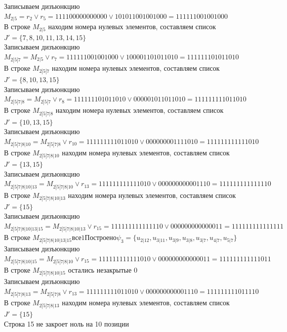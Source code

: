\documentclass[12pt,a4paper]{report}
\begin{document}
Записываем дизъюнкцию $M_{2 | 5} = r_{2}\vee r_{5} = 111100000000000 \vee 101011001001000 = 111111001001000$ \\
В строке $M_{2 | 5}$ находим номера нулевых элементов, составляем список $J' = \{7, 8, 10, 11, 13, 14, 15\}$ \\
Записываем дизъюнкцию $M_{2 | 5 | 7} = M_{2 | 5}\vee r_{7} = 111111001001000 \vee 100001101011010 = 111111101011010$ \\
В строке $M_{2 | 5 | 7}$ находим номера нулевых элементов, составляем список $J' = \{8, 10, 13, 15\}$ \\
Записываем дизъюнкцию $M_{2 | 5 | 7 | 8} = M_{2 | 5 | 7}\vee r_{8} = 111111101011010 \vee 000001011011010 = 111111111011010$ \\
В строке $M_{2 | 5 | 7 | 8}$ находим номера нулевых элементов, составляем список $J' = \{10, 13, 15\}$ \\
Записываем дизъюнкцию $M_{2 | 5 | 7 | 8 | 10} = M_{2 | 5 | 7 | 8}\vee r_{10} = 111111111011010 \vee 000000001111010 = 111111111111010$ \\
В строке $M_{2 | 5 | 7 | 8 | 10}$ находим номера нулевых элементов, составляем список $J' = \{13, 15\}$ \\
Записываем дизъюнкцию $M_{2 | 5 | 7 | 8 | 10 | 13} = M_{2 | 5 | 7 | 8 | 10}\vee r_{13} = 111111111111010 \vee 000000000001110 = 111111111111110$ \\
В строке $M_{2 | 5 | 7 | 8 | 10 | 13}$ находим номера нулевых элементов, составляем список $J' = \{15\}$ \\
Записываем дизъюнкцию $M_{2 | 5 | 7 | 8 | 10 | 13 | 15} = M_{2 | 5 | 7 | 8 | 10 | 13}\vee r_{15} = 111111111111110 \vee 000000000000011 = 111111111111111$ \\
В строке $M_{2 | 5 | 7 | 8 | 10 | 13 | 15} все 1 Построено \psi_{3} = \{u_{2 | 12},u_{3 | 11},u_{3 | 9},u_{3 | 8},u_{3 | 7},u_{4 | 7},u_{5 | 7}\}$ \\
Записываем дизъюнкцию $M_{2 | 5 | 7 | 8 | 10 | 15} = M_{2 | 5 | 7 | 8 | 10}\vee r_{15} = 111111111111010 \vee 000000000000011 = 111111111111011$ \\
В строке $M_{2 | 5 | 7 | 8 | 10 | 15}$ остались незакрытые $0$ \\
Записываем дизъюнкцию $M_{2 | 5 | 7 | 8 | 13} = M_{2 | 5 | 7 | 8}\vee r_{13} = 111111111011010 \vee 000000000001110 = 111111111011110$ \\
В строке $M_{2 | 5 | 7 | 8 | 13}$ находим номера нулевых элементов, составляем список $J' = \{15\}$ \\
Строка 15 не закроет ноль на 10 позиции \\
\end{document}
